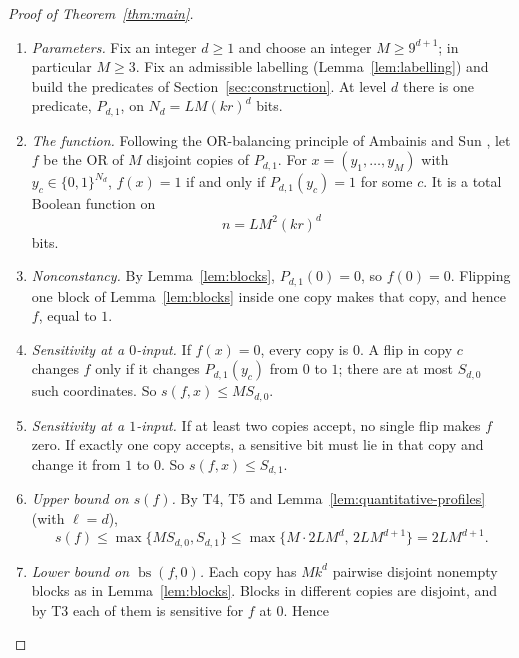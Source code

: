 \documentclass[11pt]{article}
\newcommand{\bs}{\operatorname{bs}}
\theoremstyle{definition}
\theoremstyle{remark}
\begin{document}
\begin{proof}[Proof of Theorem~\ref{thm:main}]
\begin{enumerate}[label=\textbf{T\arabic*.},leftmargin=*]
\item \emph{Parameters.} Fix an integer \(d\ge1\) and choose an integer \(M\ge9^{d+1}\); in particular \(M\ge3\). Fix an admissible labelling (Lemma~\ref{lem:labelling}) and build the predicates of Section~\ref{sec:construction}. At level \(d\) there is one predicate, \(P_{d,1}\), on \(N_d=LM(kr)^d\) bits.
\item \emph{The function.} Following the OR-balancing principle of Ambainis and Sun \cite[Section~4, Lemma~1]{AmbainisSun2011}, let \(f\) be the OR of \(M\) disjoint copies of \(P_{d,1}\). For \(x=(y_1,\ldots,y_M)\) with \(y_c\in\{0,1\}^{N_d}\), \(f(x)=1\) if and only if \(P_{d,1}(y_c)=1\) for some \(c\). It is a total Boolean function on
\begin{equation}
\label{eq:final-dimension}
 n=LM^2(kr)^d
\end{equation}
bits.
\item \emph{Nonconstancy.} By Lemma~\ref{lem:blocks}, \(P_{d,1}(0)=0\), so \(f(0)=0\). Flipping one block of Lemma~\ref{lem:blocks} inside one copy makes that copy, and hence \(f\), equal to \(1\).
\item \emph{Sensitivity at a \(0\)-input.} If \(f(x)=0\), every copy is \(0\). A flip in copy \(c\) changes \(f\) only if it changes \(P_{d,1}(y_c)\) from \(0\) to \(1\); there are at most \(S_{d,0}\) such coordinates. So \(s(f,x)\le MS_{d,0}\).
\item \emph{Sensitivity at a \(1\)-input.} If at least two copies accept, no single flip makes \(f\) zero. If exactly one copy accepts, a sensitive bit must lie in that copy and change it from \(1\) to \(0\). So \(s(f,x)\le S_{d,1}\).
\item \emph{Upper bound on \(s(f)\).} By T4, T5 and Lemma~\ref{lem:quantitative-profiles} (with \(\ell=d\)),
\begin{equation}
\label{eq:final-sensitivity}
 s(f)\leq\max\{M S_{d,0},S_{d,1}\}
       \leq\max\{M\cdot2LM^{d},\,2LM^{d+1}\}=2L M^{d+1}.
\end{equation}
\item \emph{Lower bound on \(\bs(f,0)\).} Each copy has \(Mk^d\) pairwise disjoint nonempty blocks as in Lemma~\ref{lem:blocks}. Blocks in different copies are disjoint, and by T3 each of them is sensitive for \(f\) at \(0\). Hence
\begin{equation}
\label{eq:final-block-sensitivity}

\end{equation}
\end{enumerate}
\end{proof}
\end{document}
